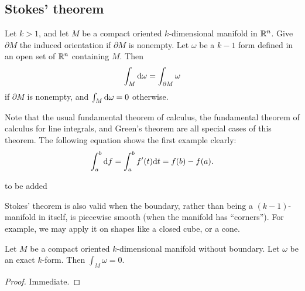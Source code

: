 \documentclass[11pt,a4paper]{article}
\begin{document}
\subsection{Stokes' theorem}

\begin{theorem}
  \label{thm:general-stokes}
  Let $k > 1$,
  and let $M$ be a compact oriented $k$-dimensional manifold in $\mathbb{R}^n$.
  Give $\partial M$ the induced orientation if $\partial M$ is nonempty.
  Let $\omega$ be a $k-1$ form defined in an open set of $\mathbb{R}^n$
  containing $M$. Then
  \[
    \int_{M} \mathrm{d} \omega =
    \int_{\partial M} \omega
  \]
  if $\partial M$ is nonempty, and $\int_{M} \mathrm{d} \omega = 0$ otherwise.
\end{theorem}
\begin{remark}
  Note that the usual fundamental theorem of calculus,
  the fundamental theorem of calculus for line integrals,
  and Green's theorem are all special cases of this theorem.
  The following equation shows the first example clearly:
  \[
    \int_{a}^{b} \mathrm{d} f =
    \int_{a}^{b} f'(t) \mathrm{d} t =
    f(b) - f(a).
  \]
\end{remark}
\begin{proofof}{}
  to be added
\end{proofof}
\begin{remark}
  Stokes' theorem is also valid when the boundary,
  rather than being a $(k-1)$-manifold in itself,
  is piecewise smooth (when the manifold has ``corners'').
  For example, we may apply it on shapes like a closed cube,
  or a cone.
\end{remark}

\begin{corollary}
  Let $M$ be a compact oriented $k$-dimensional manifold without boundary.
  Let $\omega$ be an exact $k$-form.
  Then $\int_{M} \omega = 0$.
\end{corollary}
\begin{proof}
  Immediate.
\end{proof}
\end{document}
